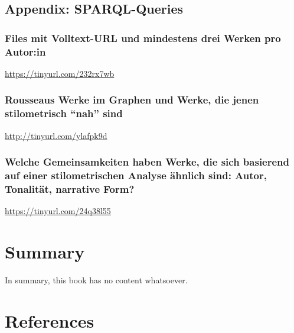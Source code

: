 \documentclass[
  12pt,
  letterpaper,
]{classicthesis}
\begin{document}
\section{Appendix: SPARQL-Queries}\label{appendix-sparql-queries}

\subsection{Files mit Volltext-URL und mindestens drei Werken pro
Autor:in}\label{files-mit-volltext-url-und-mindestens-drei-werken-pro-autorin}

\url{https://tinyurl.com/232rx7wb}

\subsection{Rousseaus Werke im Graphen und Werke, die jenen
stilometrisch ``nah''
sind}\label{rousseaus-werke-im-graphen-und-werke-die-jenen-stilometrisch-nah-sind-1}

\url{http://tinyurl.com/ylafpk9d}

\subsection{Welche Gemeinsamkeiten haben Werke, die sich basierend auf
einer stilometrischen Analyse ähnlich sind: Autor, Tonalität, narrative
Form?}\label{welche-gemeinsamkeiten-haben-werke-die-sich-basierend-auf-einer-stilometrischen-analyse-uxe4hnlich-sind-autor-tonalituxe4t-narrative-form-1}

\url{https://tinyurl.com/24q38l55}


\chapter{Summary}\label{summary}

In summary, this book has no content whatsoever.


\chapter*{References}\label{references}

\end{document}

